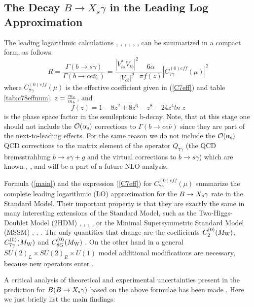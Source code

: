 \subsection{The Decay $B\to X_s\gamma$ in the Leading Log Approximation}
         \label{sec:Heff:Bsgamma:lo}
The leading logarithmic calculations \cite{Grin}, \cite{misiak:93},
\cite{aligreub:93}, \cite{CFRS:94}, \cite{CCRV:94a}, \cite{misiak:94},
\cite{BMMP:94} can be summarized in a compact form, as follows:
\begin{equation}\label{main}
R = 
\frac{\Gamma(b \to s \gamma)}{\Gamma(b \to c e
\bar{\nu}_e)}
 =  \frac{|V_{ts}^* V_{tb}^{}|^2}{|V_{cb}|^2} 
\frac{6 \alpha}{\pi f(z)} |C^{(0)eff}_{7\gamma}(\mu)|^2
\end{equation}
where $C^{(0)eff}_{7\gamma}(\mu)$ is the effective coefficient 
given in (\ref{C7eff}) and table \ref{tab:c78effnum}, $z =
\frac{m_{\rm c}}{m_{\rm b}}$, and
\begin{equation}\label{g}
f(z) = 1 - 8z^2 + 8z^6 - z^8 - 24z^4 ln \; z           
\end{equation}
is the phase space factor in the semileptonic b-decay. Note, that at
this stage one should  not include the ${\cal O}(\alpha_{\rm s})$ corrections to
$\Gamma(b \to c e \bar{\nu})$ since they are part of the
next-to-leading effects. For the same reason we do not include the
${\cal O}(\alpha_{\rm s})$ QCD corrections to the matrix element of the operator
$Q_{7\gamma}$ (the QCD bremsstrahlung $b\to s\gamma+g$ and the virtual
corrections to $b\to s\gamma$) which are known \cite{aligreub:91a},
\cite{aligreub:91b}, \cite{pott:95} and will be a part of a future NLO
analysis.

Formula (\ref{main}) and the expression (\ref{C7eff}) for
$C^{(0)eff}_{7\gamma}(\mu)$ summarize the complete leading logarithmic
(LO) approximation for the $B \to X_s \gamma$ rate in the Standard Model.  Their
important property is that they are exactly the same in many
interesting extensions of the Standard Model, such as the
Two-Higgs-Doublet Model (2HDM) \cite{Grin}, \cite{Hewett},
\cite{Barger}, \cite{Hayashi}, \cite{BMMP:94} or the Minimal
Supersymmetric Standard Model (MSSM) \cite{Borzum}, \cite{Barbieri},
\cite{Borzum2}.  The only quantities that change are the coefficients
$C^{(0)}_2(M_{\rm W})$, $C^{(0)}_{7\gamma}(M_{\rm W})$ and $C^{(0)}_{8G}(M_{\rm W})$ .
On the other hand in a general $SU(2)_L \times SU(2)_R \times U(1)$
model additional modifications are necessary, because new operators
enter \cite{LR}.

A critical analysis of theoretical and experimental
uncertainties present in the prediction for $B(B \to X_s \gamma)$ based on the
above formulae has been made \cite{BMMP:94}. Here we just briefly 
list the main findings:

